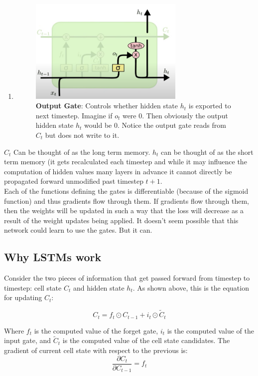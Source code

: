 \documentclass[12pt]{article}
\begin{document}
\begin{enumerate}
	\item \begin{figure}[H] \centering \includegraphics[width=0.7\textwidth]{./lstm_output_gate.png} \caption{\textbf{Output Gate}: Controls whether hidden state \(h_t\) is exported to next timestep. Imagine if \(o_t\) were 0. Then obviously the output hidden state \(h_t\) would be 0. Notice the output gate reads from \(C_t\) but does not write to it.} \end{figure}
\end{enumerate}
\(C_t\) Can be thought of as the long term memory. \(h_t\) can be thought of as the short term memory (it gets recalculated each timestep and while it may influence the computation of hidden values many layers in advance it cannot directly be propagated forward unmodified past timestep \(t+1\). \\

Each of the functions defining the gates is differentiable (because of the sigmoid function) and thus gradients flow through them. If gradients flow through them, then the weights will be updated in such a way that the loss will decrease as a result of the weight updates being applied. It doesn’t seem possible that this network could learn to use the gates. But it can.

\subsection{Why LSTMs work}

Consider the two pieces of information that get passed forward from timestep to timestep: cell state \(C_t\) and hidden state \(h_t\). As shown above, this is the equation for updating \(C_t\):

\[C_t = f_t \odot C_{t-1} + i_t \odot \tilde{C}_t\]

Where \(f_t\) is the computed value of the forget gate, \(i_t\) is the computed value of the input gate, and \(\tilde{C}_t\) is the computed value of the cell state candidates. The gradient of current cell state with respect to the previous is:
\[\frac{\partial C_t}{\partial C_{t-1}} = f_t\]
\end{document}
